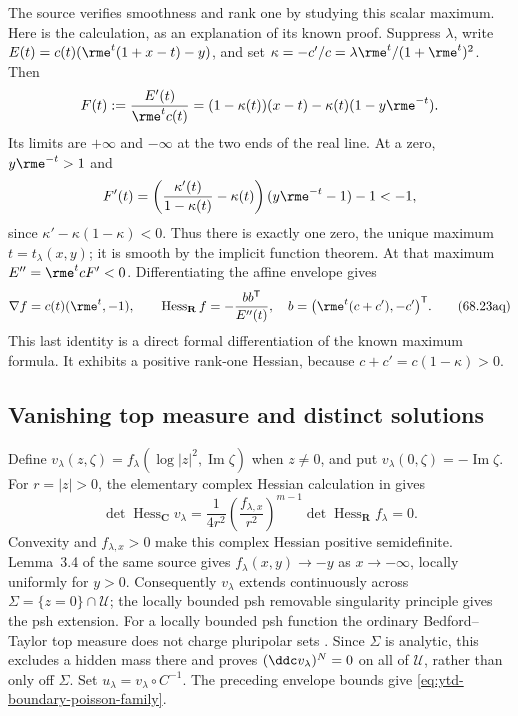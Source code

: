 The source verifies smoothness and rank one by studying this scalar
maximum. Here is the calculation, as an explanation of its known proof.
Suppress $\lambda$, write $E(t)=c(t)(\rme^t(1+x-t)-y)$, and set
$\kappa=-c'/c=\lambda\rme^t/(1+\rme^t)^2$. Then
\[
 F(t):=\frac{E'(t)}{\rme^tc(t)}
       =(1-\kappa(t))(x-t)-\kappa(t)(1-y\rme^{-t}).
\]
Its limits are $+\infty$ and $-\infty$ at the two ends of the real
line. At a zero, $y\rme^{-t}>1$ and
\[
 F'(t)=\left(\frac{\kappa'(t)}{1-\kappa(t)}-\kappa(t)\right)
                    (y\rme^{-t}-1)-1<-1,
\]
since $\kappa'-\kappa(1-\kappa)<0$. Thus there is exactly one zero,
the unique maximum $t=t_\lambda(x,y)$; it is smooth by the implicit
function theorem. At that maximum $E''=\rme^tcF'<0$.
Differentiating the affine envelope gives
\[
 \nabla f=c(t)(\rme^t,-1),\qquad
 \operatorname{Hess}_{\mathbf R}f=-\frac{bb^{\mathsf T}}{E''(t)},
 \quad b=\bigl(\rme^t(c+c'),-c'\bigr)^{\mathsf T}.
\tag{68.23aq}\label{eq:ytd-boundary-poisson-rank-one}
\]
This last identity is a direct formal differentiation of the known
maximum formula. It exhibits a positive rank-one Hessian, because
$c+c'=c(1-\kappa)>0$.

\subsection{Vanishing top measure and distinct solutions}
\label{sec:ytd-boundary-poisson-measure}

Define $v_\lambda(z,\zeta)=f_\lambda(\log|z|^2,\operatorname{Im}\zeta)$
when $z\ne0$, and put $v_\lambda(0,\zeta)=-\operatorname{Im}\zeta$.
For $r=|z|>0$, the elementary complex Hessian calculation in
\cite[Lemma~3.1]{Wang26PoissonV1} gives
\[
 \det\operatorname{Hess}_{\mathbf C}v_\lambda
 =\frac{1}{4r^2}\left(\frac{f_{\lambda,x}}{r^2}\right)^{m-1}
                   \det\operatorname{Hess}_{\mathbf R}f_\lambda=0.
\tag{68.23ar}\label{eq:ytd-boundary-poisson-determinant}
\]
Convexity and $f_{\lambda,x}>0$ make this complex Hessian positive
semidefinite. Lemma~3.4 of the same source gives
$f_\lambda(x,y)\to-y$ as $x\to-\infty$, locally uniformly for
$y>0$. Consequently $v_\lambda$ extends continuously across
$\Sigma=\{z=0\}\cap\mathcal U$; the locally bounded psh removable
singularity principle gives the psh extension.
For a locally bounded psh function the ordinary Bedford--Taylor top
measure does not charge pluripolar sets \cite{BT82}. Since $\Sigma$
is analytic, this excludes a hidden mass there and proves
$(\ddc v_\lambda)^N=0$ on all of $\mathcal U$, rather than only off
$\Sigma$. Set $u_\lambda=v_\lambda\circ C^{-1}$.
The preceding envelope bounds give \eqref{eq:ytd-boundary-poisson-family}.

